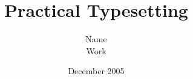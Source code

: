\documentclass[11pt,a4paper,oneside]{report}
\begin{document}
\title{\color{red}Practical Typesetting}
\author{\color{blue}Name\\ Work}
\date{\color{green}December 2005}
\maketitle
\end{document}
